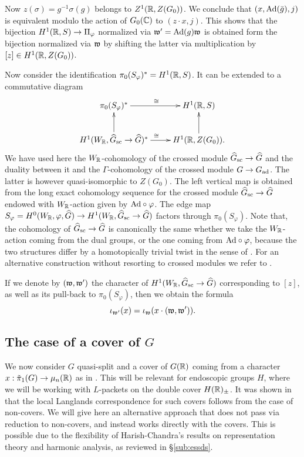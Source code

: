 \documentclass{article}
\theoremstyle{definition}
\numberwithin{equation}{section}
\renewcommand{\-}{\hyp{}}
\begin{document}
Now $z(\sigma)=g^{-1}\sigma(g)$ belongs to $Z^1(\mathbb{R},Z(G_0))$. We conclude that $(x,\textrm{Ad}(\bar g),j)$ is equivalent modulo the action of $G_0(\mathbb{C})$ to $(z\cdot x,j)$. This shows that the bijection $H^1(\mathbb{R},S) \to \Pi_\varphi$ normalized via $\mathfrak{w'}=\textrm{Ad}(g)\mathfrak{w}$ is obtained form the bijection normalized via $\mathfrak{w}$ by shifting the latter via multiplication by $[z] \in H^1(\mathbb{R},Z(G_0))$. 

Now consider the identification $\pi_0(S_\varphi)^* = H^1(\mathbb{R},S)$. It can be extended to a commutative diagram
\[ \xymatrix{
	\pi_0(S_\varphi)^*\ar[r]^\cong&H^1(\R,S)\\
	H^1(W_\R,\hat G_\tx{sc} \to \hat G)^*\ar[u]\ar[r]^\cong&H^1(\R,Z(G_0)).\ar[u]
}
\]
We have used here the $W_{\mathbb{R}}$-cohomology of the crossed module $\widehat G_{\textrm{sc}} \to \widehat G$ and the duality between it and the $\Gamma$-cohomology of the crossed module $G \to G_{\textrm{ad}}$. The latter is however quasi-isomorphic to $Z(G_0)$. The left vertical map is obtained from the long exact cohomology sequence for the crossed module $\widehat G_{\textrm{sc}} \to \widehat G$ endowed with $W_{\mathbb{R}}$-action given by $\textrm{Ad}\circ\varphi$. The edge map $S_\varphi=H^0(W_{\mathbb{R}},\varphi,\widehat G) \to H^1(W_{\mathbb{R}},\widehat G_{\textrm{sc}} \to \widehat G)$ factors through $\pi_0(S_\varphi)$. Note that, the cohomology of $\widehat G_{\textrm{sc}} \to \widehat G$ is canonically the same whether we take the $W_{\mathbb{R}}$-action coming from the dual groups, or the one coming from $\textrm{Ad}\circ\varphi$, because the two structures differ by a homotopically trivial twist in the sense of \cite[\S2.4]{KalECI}. For an alternative construction without resorting to crossed modules we refer to \cite[\S4]{KalGen}.

If we denote by $(\mathfrak{w},\mathfrak{w'})$ the character of $H^1(W_{\mathbb{R}},\widehat G_{\textrm{sc}} \to \widehat G)$ corresponding to $[z]$, as well as its pull-back to $\pi_0(S_\varphi)$, then we obtain the formula
\begin{equation}
	\iota_{\mathfrak{w'}}(x) = \iota_{\mathfrak{w}}(x \cdot (\mathfrak{w},\mathfrak{w'})).
\end{equation}


\subsection{The case of a cover of $G$} \label{sub:packetcover}

We now consider $G$ quasi-split and a cover of $G(\mathbb{R})$ coming from a character $x : \tilde\pi_1(G) \to \mu_n(\mathbb{R})$ as in \cite{KalHDC}. This will be relevant for endoscopic groups $H$, where we will be working with $L$\-packets on the double cover $H(\mathbb{R})_\pm$. It was shown in \cite[\S2.6]{KalHDC} that the local Langlands correspondence for such covers follows from the case of non-covers. We will give here an alternative approach that does not pass via reduction to non-covers, and instead works directly with the covers. This is possible due to the flexibility of Harish-Chandra's results on representation theory and harmonic analysis, as reviewed in \S\ref{sub:essds}.
\end{document}

